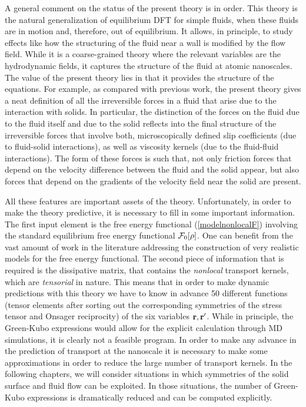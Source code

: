 \documentclass[b5paper,openright,10pt]{book}
\begin{document}
A  general comment  on the  status of the  present theory  is in
order.   This  theory is  the  natural  generalization of  equilibrium
DFT for simple  fluids, when these fluids are in
motion and, therefore, out of equilibrium. It allows, in principle, to
study effects  like how the  structuring of the  fluid near a  wall is
modified by the flow field. While  it is a coarse-grained theory where
the relevant  variables are the  hydrodynamic fields, it  captures the
structure of the fluid at atomic nanoscales.  The value of the present
theory lies in  that it provides the structure of  the equations.  For
example, as  compared with previous  work, the present theory  gives a
neat definition of  all the irreversible forces in a  fluid that arise
due to the interaction with solids.  In particular, the distinction of
the forces on the  fluid due to the fluid itself and  due to the solid
reflects  into the  final structure  of the  irreversible forces  that
involve  both,  microscopically  defined  slip  coefficients  (due  to
fluid-solid interactions),  as well as  viscosity kernels (due  to the
fluid-fluid interactions).  The form of these forces is such that, not
only friction  forces that depend  on the velocity  difference between
the fluid  and the solid  appear, but also  forces that depend  on the
gradients of the velocity field near the solid are present.

All these features are important  assets of the theory. Unfortunately,
in order  to make the  theory predictive, it  is necessary to  fill in
some  important information.   The  first input  element  is the  free
energy  functional   (\ref{modelnonlocalF})  involving   the  standard
equilibrium  free  energy  functional  ${\cal  F}_0[\rho]$.   One  can
benefit from the vast amount of  work in the literature addressing the
construction   of  very   realistic   models  for   the  free   energy
functional. The  second piece of  information that is required  is the
dissipative  matrix, that  contains  the \textit{nonlocal}  transport
kernels, which are  \textit{tensorial} in nature.  This  means that in
order to make dynamic predictions with  this theory we have to know in
advance 50 different functions (tensor  elements after sorting out the
corresponding symmetries of the stress tensor and Onsager reciprocity)
of  the six  variables ${\bf  r},{\bf r}'$.   While in  principle, the
Green-Kubo  expressions  would  allow  for  the  explicit  calculation
through MD simulations, it is clearly not a feasible program. In order
to make any advance in the prediction of transport at the nanoscale it
is necessary to make some approximations  in order to reduce the large
number of transport  kernels.  In the following chapters,  we will consider situations
in  which symmetries  of  the  solid surface  and  fluid  flow can  be
exploited.  In those situations,  the number of Green-Kubo expressions
is dramatically reduced and can be computed explicitly.
\end{document}
